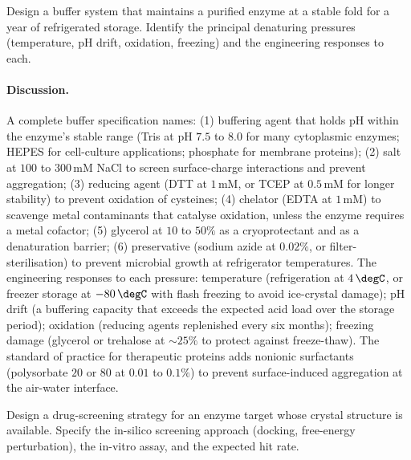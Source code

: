 \begin{exercise}
Design a buffer system that maintains a purified enzyme at a stable
fold for a year of refrigerated storage. Identify the principal
denaturing pressures (temperature, pH drift, oxidation, freezing) and
the engineering responses to each.
\end{exercise}

\paragraph{Discussion.}
A complete buffer specification names: (1) buffering agent that
holds pH within the enzyme's stable range (Tris at pH $7.5$ to $8.0$
for many cytoplasmic enzymes; HEPES for cell-culture applications;
phosphate for membrane proteins); (2) salt at $100$ to $300\,\text{mM}$
NaCl to screen surface-charge interactions and prevent aggregation;
(3) reducing agent (DTT at $1\,\text{mM}$, or TCEP at $0.5\,\text{mM}$
for longer stability) to prevent oxidation of cysteines; (4)
chelator (EDTA at $1\,\text{mM}$) to scavenge metal contaminants
that catalyse oxidation, unless the enzyme requires a metal cofactor;
(5) glycerol at $10$ to $50\%$ as a cryoprotectant and as a
denaturation barrier; (6) preservative (sodium azide at $0.02\%$, or
filter-sterilisation) to prevent microbial growth at refrigerator
temperatures. The engineering responses to each pressure: temperature
(refrigeration at $4\,\degC$, or freezer storage at $-80\,\degC$
with flash freezing to avoid ice-crystal damage); pH drift (a
buffering capacity that exceeds the expected acid load over the
storage period); oxidation (reducing agents replenished every six
months); freezing damage (glycerol or trehalose at $\sim 25\%$ to
protect against freeze-thaw). The standard of practice for
therapeutic proteins adds nonionic surfactants (polysorbate $20$ or
$80$ at $0.01$ to $0.1\%$) to prevent surface-induced aggregation at
the air-water interface.

\begin{exercise}
Design a drug-screening strategy for an enzyme target whose
crystal structure is available. Specify the in-silico screening
approach (docking, free-energy perturbation), the in-vitro assay,
and the expected hit rate.
\end{exercise}

